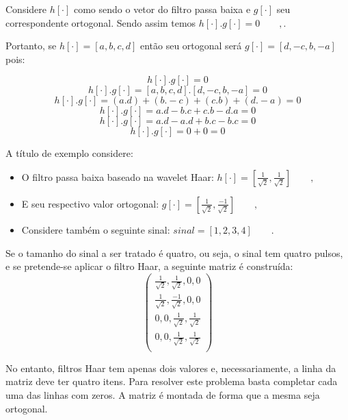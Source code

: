 			\par Considere $h[\cdot]$ como sendo o vetor do filtro passa baixa e $g[\cdot]$ seu correspondente ortogonal. Sendo assim temos $h[\cdot] . g[\cdot] = 0\qquad,$.
			
			\par Portanto, se $h[\cdot]=[a, b, c, d]$ então seu ortogonal será $g[\cdot]=[d, -c, b, -a]$ pois:
			
			\begin{equation}
				h[\cdot] . g[\cdot]  = 0
			\end{equation}
			\begin{equation}
				h[\cdot] . g[\cdot]  = [a, b, c, d] . [d, -c, b, -a] = 0
			\end{equation}
			\begin{equation}
				h[\cdot] . g[\cdot]  = (a.d) + (b.-c) + (c.b) + (d.-a) = 0
			\end{equation}
			\begin{equation}
				h[\cdot] . g[\cdot]  = a.d - b.c + c.b - d.a = 0
			\end{equation}
			\begin{equation}
				h[\cdot] . g[\cdot]  = a.d - a.d + b.c - b.c = 0
			\end{equation}
			\begin{equation}
				h[\cdot] . g[\cdot]  = 0 + 0 = 0
			\end{equation}

			\par A título de exemplo considere:
			\begin{itemize}
				\item O filtro passa baixa baseado na wavelet Haar: $h[\cdot] = [\frac{1}{\sqrt{2}}, \frac{1}{\sqrt{2}}]\qquad,$
				\item E seu respectivo valor ortogonal: $g[\cdot] = [\frac{1}{\sqrt{2}}, \frac{-1}{\sqrt{2}}]\qquad,$
				\item Considere também o seguinte sinal:	$sinal = [1,2,3,4]\qquad.$
			\end{itemize}

			\par Se o tamanho do sinal a ser tratado é quatro, ou seja, o sinal tem quatro pulsos, e se pretende-se aplicar o filtro Haar, a seguinte matriz é construída:
			\begin{equation}
				\begin{pmatrix}
					\frac{1}{\sqrt{2}}, \frac{1}{\sqrt{2}}, 0, 0\\
					\frac{1}{\sqrt{2}}, \frac{-1}{\sqrt{2}}, 0, 0\\
					0, 0, \frac{1}{\sqrt{2}}, \frac{1}{\sqrt{2}}\\
					0, 0, \frac{1}{\sqrt{2}}, \frac{1}{\sqrt{2}}\\
					\label{eq:haarFilters}
				\end{pmatrix} 
			\end{equation}
			\par No entanto, filtros Haar tem apenas dois valores e, necessariamente, a linha da matriz deve ter quatro itens. Para resolver este problema basta completar cada uma das linhas com zeros. A matriz é montada de forma que a mesma seja ortogonal.

